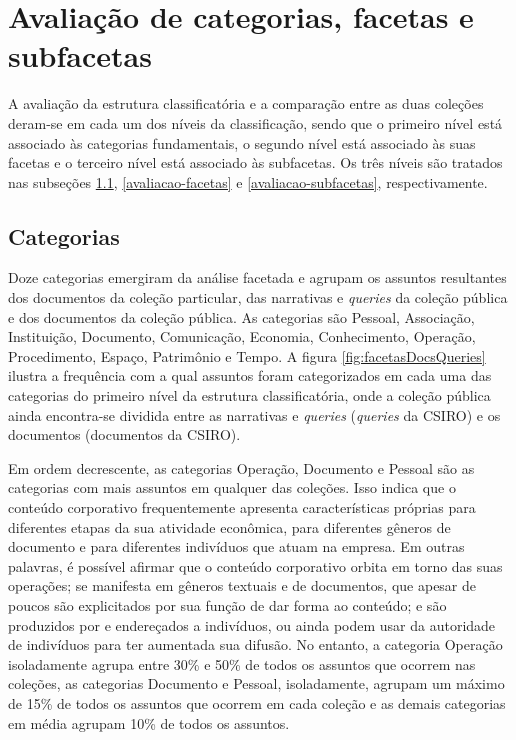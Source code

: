 \section{Avaliação de categorias, facetas e subfacetas}
\label{analiseDominioRes}

A avaliação da estrutura classificatória e a comparação entre as duas coleções deram-se em cada um dos níveis da classificação, sendo que o primeiro nível está associado às categorias fundamentais, o segundo nível está associado às suas facetas e o terceiro nível está associado às subfacetas. Os três níveis são tratados nas subseções \ref{avaliacao-categorias}, \ref{avaliacao-facetas} e \ref{avaliacao-subfacetas}, respectivamente.

\subsection{Categorias}
\label{avaliacao-categorias}

Doze categorias emergiram da análise facetada e agrupam os assuntos resultantes dos documentos da coleção particular, das narrativas e \textit{queries} da coleção pública e dos documentos da coleção pública. As categorias são Pessoal, Associação, Instituição, Documento, Comunicação, Economia, Conhecimento, Operação, Procedimento, Espaço, Patrimônio e Tempo. A figura \ref{fig:facetasDocsQueries} ilustra a frequência com a qual assuntos foram categorizados em cada uma das categorias do primeiro nível da estrutura classificatória, onde a coleção pública ainda encontra-se dividida entre as narrativas e \textit{queries} (\textit{queries} da CSIRO) e os documentos (documentos da CSIRO).

Em ordem decrescente, as categorias Operação, Documento e Pessoal são as categorias com mais assuntos em qualquer das coleções. Isso indica que o conteúdo corporativo frequentemente apresenta características próprias para diferentes etapas da sua atividade econômica, para diferentes gêneros de documento e para diferentes indivíduos que atuam na empresa. Em outras palavras, é possível afirmar que o conteúdo corporativo orbita em torno das suas operações; se manifesta em gêneros textuais e de documentos, que apesar de poucos são explicitados por sua função de dar forma ao conteúdo; e são produzidos por e endereçados a indivíduos, ou ainda podem usar da autoridade de indivíduos para ter aumentada sua difusão. No entanto, a categoria Operação isoladamente agrupa entre 30\% e 50\%  de todos os assuntos que ocorrem nas coleções, as categorias Documento e Pessoal, isoladamente, agrupam um máximo de 15\% de todos os assuntos que ocorrem em cada coleção e as demais categorias em média agrupam 10\% de todos os assuntos.

